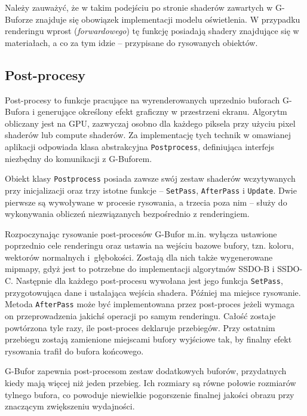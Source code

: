 		Należy zauważyć, że w takim podejściu po stronie shaderów zawartych w G-Buforze znajduje się obowiązek implementacji modelu oświetlenia. W przypadku renderingu wprost (\emph{forwardowego}) tę funkcję posiadają shadery znajdujące się w materiałach, a co za tym idzie -- przypisane do rysowanych obiektów.
		
		\subsection{Post-procesy}
		\label{t:budowa:rendering:postprocesy}
		
		
		Post-procesy to funkcje pracujące na wyrenderowanych uprzednio buforach G-Bufora i generujące określony efekt graficzny w przestrzeni ekranu. Algorytm obliczany jest na GPU, zazwyczaj osobno dla każdego piksela przy użyciu pixel shaderów lub compute shaderów. Za implementację tych technik w omawianej aplikacji odpowiada klasa abstrakcyjna \texttt{Postprocess}, definiująca interfejs niezbędny do komunikacji z G-Buforem.
		
		Obiekt klasy \texttt{Postprocess} posiada zawsze swój zestaw shaderów wczytywanych przy inicjalizacji oraz trzy istotne funkcje -- \texttt{SetPass}, \texttt{AfterPass} i \texttt{Update}. Dwie pierwsze są wywoływane w procesie rysowania, a trzecia poza nim -- służy do wykonywania obliczeń niezwiązanych bezpośrednio z renderingiem.
		
		Rozpoczynając rysowanie post-procesów G-Bufor m.in. wyłącza ustawione poprzednio cele renderingu oraz ustawia na wejściu bazowe bufory, tzn. koloru, wektorów normalnych i~głębokości. Zostają dla nich także wygenerowane mipmapy, gdyż jest to potrzebne do implementacji algorytmów SSDO-B i SSDO-C. Następnie dla każdego post-procesu wywołana jest jego funkcja \texttt{SetPass}, przygotowująca dane i ustalająca wejścia shadera. Później ma miejsce rysowanie. Metoda \texttt{AfterPass} może być implementowana przez post-proces jeżeli wymaga on przeprowadzenia jakichś operacji po samym renderingu. Całość zostaje powtórzona tyle razy, ile post-proces deklaruje przebiegów. Przy ostatnim przebiegu zostają zamienione miejscami bufory wyjściowe tak, by finalny efekt rysowania trafił do bufora końcowego.
		
		G-Bufor zapewnia post-procesom zestaw dodatkowych buforów, przydatnych kiedy mają więcej niż jeden przebieg. Ich rozmiary są równe połowie rozmiarów tylnego bufora, co powoduje niewielkie pogorszenie finalnej jakości obrazu przy znaczącym zwiększeniu wydajności.
		
